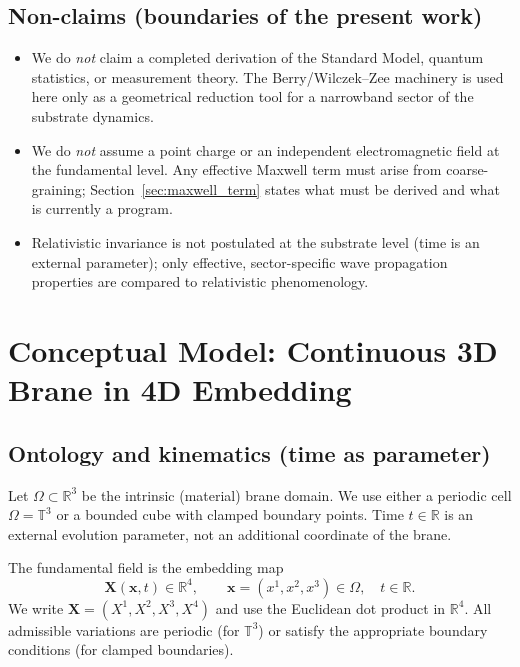 \documentclass[11pt,a4paper]{article}
\begin{document}
\subsection*{Non-claims (boundaries of the present work)}
\begin{itemize}
  \item We do \emph{not} claim a completed derivation of the Standard Model, quantum statistics, or measurement
        theory. The Berry/Wilczek--Zee machinery is used here only as a geometrical reduction tool for a
        narrowband sector of the substrate dynamics.
  \item We do \emph{not} assume a point charge or an independent electromagnetic field at the fundamental level.
        Any effective Maxwell term must arise from coarse-graining; Section~\ref{sec:maxwell_term} states what
        must be derived and what is currently a program.
  \item Relativistic invariance is not postulated at the substrate level (time is an external parameter); only
        effective, sector-specific wave propagation properties are compared to relativistic phenomenology.
\end{itemize}


\section{Conceptual Model: Continuous 3D Brane in 4D Embedding}

\label{sec:conceptual_model_continuous}

\subsection{Ontology and kinematics (time as parameter)}
Let $\Omega\subset\mathbb{R}^3$ be the intrinsic (material) brane domain.
We use either a periodic cell $\Omega=\mathbb{T}^3$ or a bounded cube with
clamped boundary points. Time $t\in\mathbb{R}$ is an external evolution
parameter, not an additional coordinate of the brane.

The fundamental field is the embedding map
\begin{equation}
  \mathbf{X}(\mathbf{x},t)\in\mathbb{R}^4,
  \qquad \mathbf{x}=(x^1,x^2,x^3)\in\Omega,\quad t\in\mathbb{R}.
\end{equation}
We write $\mathbf{X}=(X^1,X^2,X^3,X^4)$ and use the Euclidean dot product
in $\mathbb{R}^4$.
All admissible variations are periodic (for $\mathbb{T}^3$) or satisfy the
appropriate boundary conditions (for clamped boundaries).
\end{document}
